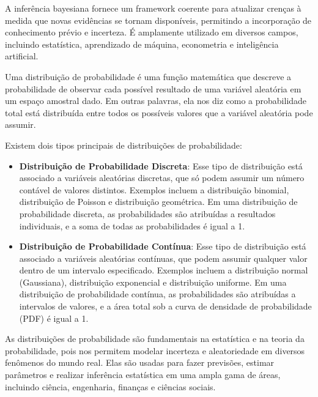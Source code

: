 \begin{apendicesenv}
	\par A inferência bayesiana fornece um framework coerente para atualizar crenças à medida que novas evidências se tornam disponíveis, permitindo a incorporação de conhecimento prévio e incerteza. É amplamente utilizado em diversos campos, incluindo estatística, aprendizado de máquina, econometria e inteligência artificial.
	
	\par Uma distribuição de probabilidade é uma função matemática que descreve a probabilidade de observar cada possível resultado de uma variável aleatória em um espaço amostral dado. Em outras palavras, ela nos diz como a probabilidade total está distribuída entre todos os possíveis valores que a variável aleatória pode assumir.\par
	
	\par Existem dois tipos principais de distribuições de probabilidade:
	\begin{itemize}
		\item \textbf{Distribuição de Probabilidade Discreta}: Esse tipo de distribuição está associado a variáveis aleatórias discretas, que só podem assumir um número contável de valores distintos. Exemplos incluem a distribuição binomial, distribuição de Poisson e distribuição geométrica. Em uma distribuição de probabilidade discreta, as probabilidades são atribuídas a resultados individuais, e a soma de todas as probabilidades é igual a 1.
		
		\item \textbf{Distribuição de Probabilidade Contínua}: Esse tipo de distribuição está associado a variáveis aleatórias contínuas, que podem assumir qualquer valor dentro de um intervalo especificado. Exemplos incluem a distribuição normal (Gaussiana), distribuição exponencial e distribuição uniforme. Em uma distribuição de probabilidade contínua, as probabilidades são atribuídas a intervalos de valores, e a área total sob a curva de densidade de probabilidade (PDF) é igual a 1.
	\end{itemize}\par
	
	\par As distribuições de probabilidade são fundamentais na estatística e na teoria da probabilidade, pois nos permitem modelar incerteza e aleatoriedade em diversos fenômenos do mundo real. Elas são usadas para fazer previsões, estimar parâmetros e realizar inferência estatística em uma ampla gama de áreas, incluindo ciência, engenharia, finanças e ciências sociais.\par
	

\end{apendicesenv}
